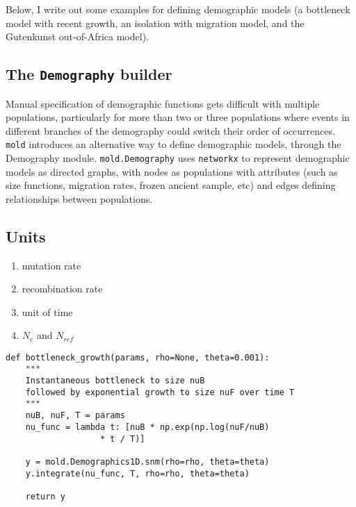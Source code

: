\documentclass[11pt]{article}
\makeatletter
\newcommand{\mold}{\texttt{mold}\xspace}
\newcommand{\py}[1]{\lstinline[breaklines=true,language=Python, showstringspaces=False]@#1@}
\makeatother
\begin{document}
Below, I write out some examples for defining demographic models (a bottleneck model with recent growth, an isolation with migration model, and the Gutenkunst out-of-Africa model).

\subsection{The \texttt{Demography} builder}

Manual specification of demographic functions gets difficult with multiple populations, particularly for more than two or three populations where events in different branches of the demography could switch their order of occurrences.
\mold introduces an alternative way to define demographic models, through the Demography module.
\py{mold.Demography} uses \py{networkx} to represent demographic models as directed graphs, with nodes as populations with attributes (such as size functions, migration rates, frozen ancient sample, etc) and edges defining relationships between populations.



\subsection{Units}
\begin{enumerate}
\item mutation rate
\item recombination rate
\item unit of time
\item $N_e$ and $N_{ref}$
\end{enumerate}

\clearpage

\begin{lstlisting}[caption={\textbf{Bottleneck model:} At time \py{T} in the past, an equilibrium population goes through a bottleneck of depth \py{nuB}, recovering to relative size \py{nuF} through exponential growth. In all examples listed here, we need to \py{import numpy as np} and \py{import moments.LD as mold}.}, float, label={lst:bottleneck}]
def bottleneck_growth(params, rho=None, theta=0.001):
    """
    Instantaneous bottleneck to size nuB
    followed by exponential growth to size nuF over time T
    """
    nuB, nuF, T = params
    nu_func = lambda t: [nuB * np.exp(np.log(nuF/nuB) 
    			   * t / T)]

    y = mold.Demographics1D.snm(rho=rho, theta=theta)
    y.integrate(nu_func, T, rho=rho, theta=theta)

    return y
\end{lstlisting}
\end{document}
